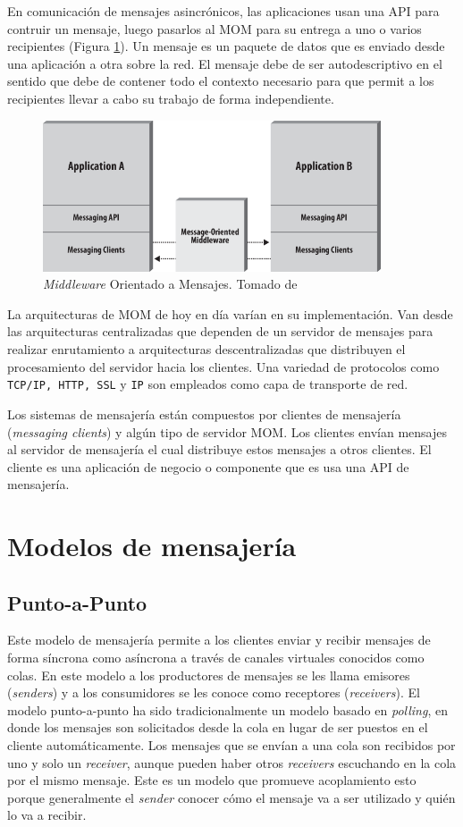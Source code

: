 \documentclass[11pt, twoside]{report}
\begin{document}
En comunicación de mensajes asincrónicos, las aplicaciones usan una API para contruir un mensaje, luego pasarlos al MOM para su entrega a uno o varios recipientes (Figura \ref{fig:mom}). Un mensaje es un paquete de datos que es enviado desde una aplicación a otra sobre la red. El mensaje debe de ser autodescriptivo en el sentido que debe de contener todo el contexto necesario para que permit a los recipientes llevar a cabo su trabajo de forma independiente. 


\begin{figure}[h]
  \centering
  \includegraphics[width=10cm]{jms20-mom}
  \caption{\small{\emph{Middleware} Orientado a Mensajes. Tomado de \cite{jms20}}}
  \label{fig:mom}
\end{figure} 

La arquitecturas de MOM de hoy en día varían en su implementación. Van desde las arquitecturas centralizadas que dependen de un servidor de mensajes para realizar enrutamiento a arquitecturas descentralizadas que distribuyen el procesamiento del servidor hacia los clientes. Una variedad de protocolos como \texttt{TCP/IP, HTTP, SSL} y \texttt{IP} son empleados como capa de transporte de red.

Los sistemas de mensajería están compuestos por clientes de mensajería (\emph{messaging clients}) y algún tipo de servidor MOM. Los clientes envían mensajes al servidor de mensajería el cual distribuye estos mensajes a otros clientes. El cliente es una aplicación de negocio o componente que es usa una API de mensajería.

\section{Modelos de mensajería}

\subsection{Punto-a-Punto}
Este modelo de mensajería permite a los clientes enviar y recibir mensajes de forma síncrona como asíncrona a través de canales virtuales conocidos como colas. En este modelo a los productores de mensajes se les llama emisores (\emph{senders}) y a los consumidores se les conoce como receptores (\emph{receivers}). El modelo punto-a-punto ha sido tradicionalmente un modelo basado en \emph{polling}, en donde los mensajes son solicitados desde la cola en lugar de ser puestos en el cliente automáticamente. Los mensajes que se envían a una cola son recibidos por uno y solo un \emph{receiver}, aunque pueden haber otros \emph{receivers} escuchando en la cola por el mismo mensaje. Este es un modelo que promueve acoplamiento esto porque generalmente el \emph{sender} conocer cómo el mensaje va a ser utilizado y quién lo va a recibir. 
\end{document}
